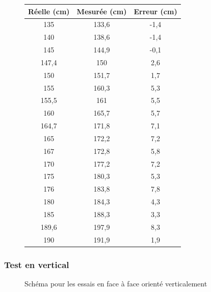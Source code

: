 \documentclass[11pt,a4paper]{article}
\begin{document}
\begin{figure}[H]
\begin{minipage}[t]{0.48\textwidth}
\begin{tabular}{|c|c|c|}
      Réelle (cm) & Mesurée (cm) & Erreur (cm) \\ \hline
      135   & 133,6 & -1,4 \\ \hline
      140   & 138,6 & -1,4 \\ \hline
      145   & 144,9 & -0,1 \\ \hline
      147,4 & 150   & 2,6  \\ \hline
      150   & 151,7 & 1,7  \\ \hline
      155   & 160,3 & 5,3  \\ \hline
      155,5 & 161   & 5,5  \\ \hline
      160   & 165,7 & 5,7  \\ \hline
      164,7 & 171,8 & 7,1  \\ \hline
      165   & 172,2 & 7,2  \\ \hline
      167   & 172,8 & 5,8  \\ \hline
      170   & 177,2 & 7,2  \\ \hline
      175   & 180,3 & 5,3  \\ \hline
      176   & 183,8 & 7,8  \\ \hline
      180   & 184,3 & 4,3  \\ \hline
      185   & 188,3 & 3,3  \\ \hline
      189,6 & 197,9 & 8,3  \\ \hline
      190   & 191,9 & 1,9  \\ \hline
    \end{tabular}
  \end{minipage}

\end{figure}
\subsubsection{Test en vertical}

\begin{figure}[H]
  \centering
  \FtFVertical
  \caption{Schéma pour les essais en face à face orienté verticalement}
\end{figure}
\end{document}
